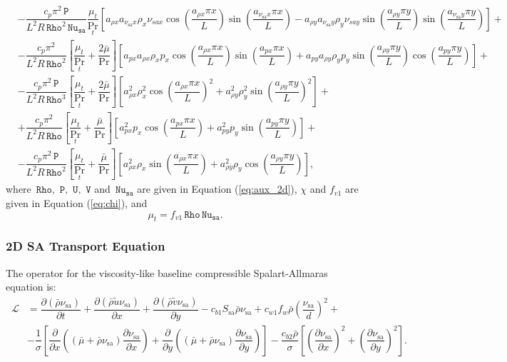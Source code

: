 \documentclass[10pt]{article}
\newcommand{\Diff}[2] {\dfrac{\partial( #1)}{\partial #2}}
\newcommand{\diff}[2] {\dfrac{\partial #1}{\partial #2}}
\newcommand{\Rho}{\,\mathtt{Rho}}
\newcommand{\PP}{\,\mathtt{P}}
\newcommand{\U}{\,\mathtt{U}}
\newcommand{\V}{\,\mathtt{V}}
\newcommand{\Nu}{\,\mathtt{Nu_{sa}}}
\newcommand{\Lo}{\,\mathcal{L}}
\newcommand{\sa}{\nu_{\mathrm{sa}}}
\newcommand{\tsa}{\mathrm{sa}}
\newcommand{\brho}{\bar{\rho}}
\newcommand{\tu}{\tilde{u}}
\newcommand{\tv}{\tilde{v}}
\newcommand{\bmu}{\bar{\mu}}
\begin{document}
\begin{equation}
\begin{split}
 &- \dfrac{c_p \pi^2 \PP}{L^2 R \Rho^2 \Nu}\dfrac{\mu_t}{\Pr_t} \left[a_{\rho x} a_{\sa x} \rho_x \nu_{sa x} \cos\left(\dfrac{a_{\rho x} \pi x}{L}\right) \sin\left(\dfrac{a_{\sa x} \pi x}{L}\right)-a_{\rho y} a_{\sa y} \rho_y \nu_{sa y} \sin\left(\dfrac{a_{\rho y} \pi y}{L}\right) \sin\left(\dfrac{a_{\sa y} \pi y}{L}\right)\right] +\\
 &-\dfrac{c_p \pi^2}{ L^2 R \Rho^2}\left[\dfrac{\mu_t}{\Pr_t}+\dfrac{2\bmu}{\Pr}\right]\left[a_{px} a_{\rho x} \rho_x p_x \cos\left(\dfrac{a_{\rho x} \pi x}{L}\right) \sin\left(\dfrac{a_{px} \pi x}{L}\right)+a_{py} a_{\rho y} \rho_y p_y \sin\left(\dfrac{a_{\rho y} \pi y}{L}\right) \cos\left(\dfrac{a_{py} \pi y}{L}\right)\right] +\\
 &-\dfrac{c_p \pi^2 \PP}{ L^2 R \Rho^3}\left[\dfrac{\mu_t}{\Pr_t}+\dfrac{2\bmu}{\Pr}\right]\left[a_{\rho x}^2 \rho_x^2 \cos\left(\dfrac{a_{\rho x} \pi x}{L}\right)^2+a_{\rho y}^2 \rho_y^2 \sin\left(\dfrac{a_{\rho y} \pi y}{L}\right)^2\right] +\\
 &+\dfrac{c_p \pi^2}{L^2 R \Rho}\left[\dfrac{\mu_t}{\Pr_t}+\dfrac{\bmu}{\Pr}\right] \left[a_{px}^2 p_x \cos\left(\dfrac{a_{px} \pi x}{L}\right)+a_{py}^2 p_y \sin\left(\dfrac{a_{py} \pi y}{L}\right)\right] +\\
%
&-\dfrac{c_p \pi^2 \PP}{L^2 R \Rho^2}\left[\dfrac{\mu_t}{\Pr_t}+\dfrac{\bmu}{\Pr}\right] \left[a_{\rho x}^2 \rho_x \sin\left(\dfrac{a_{\rho x} \pi x}{L}\right)+a_{\rho y}^2 \rho_y \cos\left(\dfrac{a_{\rho y} \pi y}{L}\right)\right],
 \end{split}
\end{equation}
where  $\Rho,\,\PP,\, \U,\,\V$ and $\Nu$ are given in Equation (\ref{eq:aux_2d}),  $\chi$ and $f_{v1}$ are given in  Equation (\ref{eq:chi}),   and  $$\mu_t= f_{v1} \Rho \Nu.$$


\subsubsection{2D SA Transport Equation}

The operator for the viscosity-like baseline compressible Spalart-Allmaras equation is:
\begin{equation*}
\begin{split}
\Lo&=  \Diff{\brho \sa }{t}+ \Diff{\brho \tu \sa }{x}+\Diff{\brho \tv \sa}{y}- c_{b1} S_\tsa \bar{\rho} \sa +c_{w1} f_w \brho \left(\dfrac{\sa}{d}\right)^2 +\\
   &- \dfrac{1 }{\sigma}\left[\diff{}{x}\left((\bmu+\bar{\rho} \sa) \diff{\sa}{x}\right)+\diff{}{y}\left((\bmu+\bar{\rho} \sa) \diff{\sa}{y}\right)\right] -\dfrac{c_{b2} \bar{\rho} }{\sigma} \left[ \left(\diff{\sa}{x}\right)^2 + \left(\diff{\sa}{y}\right)^2\right].
\end{split}
\end{equation*}
\end{document}
